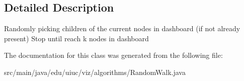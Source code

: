 \subsection{Detailed Description}
Randomly picking children of the current nodes in dashboard (if not already present) Stop until reach k nodes in dashboard 

The documentation for this class was generated from the following file\+:\begin{DoxyCompactItemize}
\item 
src/main/java/edu/uiuc/viz/algorithms/Random\+Walk.\+java\end{DoxyCompactItemize}
